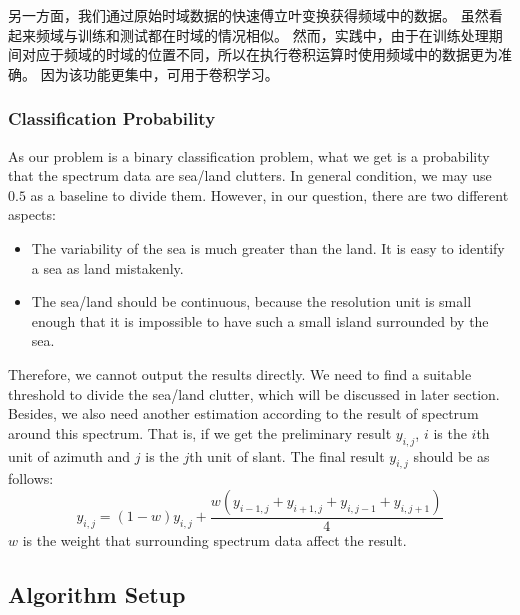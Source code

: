 另一方面，我们通过原始时域数据的快速傅立叶变换获得频域中的数据。 虽然看起来频域与训练和测试都在时域的情况相似。 然而，实践中，由于在训练处理期间对应于频域的时域的位置不同，所以在执行卷积运算时使用频域中的数据更为准确。 因为该功能更集中，可用于卷积学习。

\subsubsection{Classification Probability}
As our problem is a binary classification problem, what we get is a probability that the spectrum data are sea/land clutters. In general condition, we may use $0.5$ as a baseline to divide them. However, in our question, there are two different aspects:
\begin{itemize}
	\item The variability of the sea is much greater than the land. It is easy to identify a sea as land mistakenly.
	\item The sea/land should be continuous, because the resolution unit is small enough that it is impossible to have such a small island surrounded by the sea.
\end{itemize}
Therefore, we cannot output the results directly. We need to find a suitable threshold to divide the sea/land clutter, which will be discussed in later section. Besides, we also need another estimation according to the result of spectrum around this spectrum. That is, if we get the preliminary result $y_{i, j}$, $i$ is the $i$th unit of azimuth and $j$ is the $j$th unit of slant. The final result $y_{i, j}$ should be as follows:
\begin{equation}
y_{i, j} = (1 - w)  y_{i, j} + \frac{w  (y_{i - 1, j} + y_{i + 1, j} + y_{i, j - 1} + y_{i, j + 1})}{4}
\end{equation}
$w$ is the weight that surrounding spectrum data affect the result.
\subsection{Algorithm Setup}

